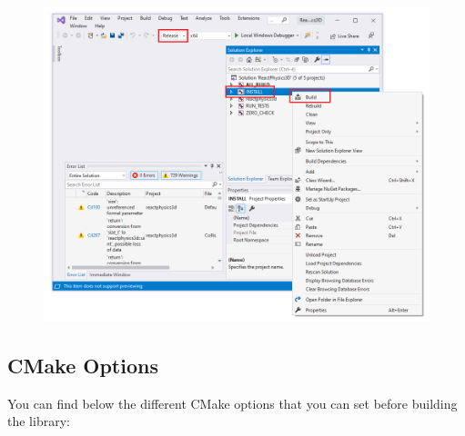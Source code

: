\documentclass[a4paper,12pt]{article}
\begin{document}
    \begin{figure}
        \centering
        \includegraphics[scale=0.5]{VSInstall.png}
        \label{fig:vsinstall}
    \end{figure}

    \vspace{5.0cm}

     \subsection{CMake Options}
     \label{sec:cmakevariables}

     You can find below the different CMake options that you can set before building the library:
\end{document}
